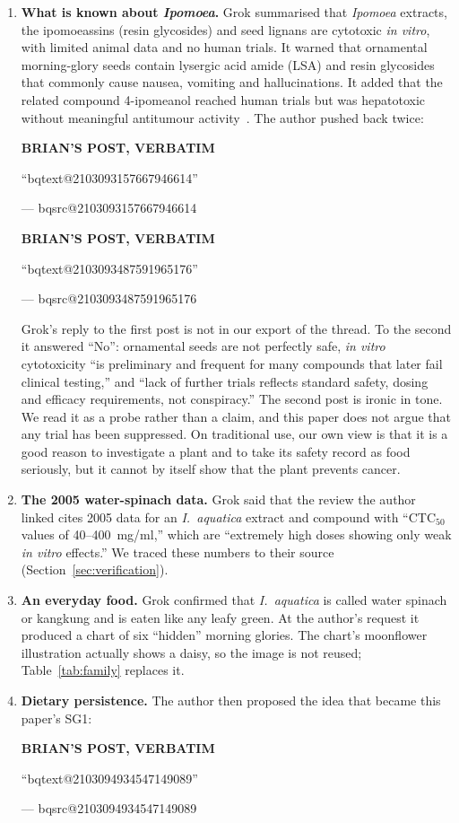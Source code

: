 \documentclass[11pt,a4paper]{article}
\makeatletter
\newcommand{\BQ}[1]{\begin{tcolorbox}[bqstyle]%
{\sffamily\bfseries\footnotesize\color{teal!80!black}BRIAN'S POST, VERBATIM}\par\smallskip
``\csname bqtext@#1\endcsname''\par\smallskip
{\raggedleft\footnotesize --- \csname bqsrc@#1\endcsname\par}\end{tcolorbox}}
\newcommand{\Ia}{\emph{I.~aquatica}}
\makeatother
\begin{document}
\begin{enumerate}[label=\textbf{\arabic*.}]
\item \textbf{What is known about \emph{Ipomoea}.} Grok summarised that \emph{Ipomoea} extracts, the ipomoeassins (resin glycosides) and seed lignans are cytotoxic \emph{in vitro}, with limited animal data and no human trials. It warned that ornamental morning-glory seeds contain lysergic acid amide (LSA) and resin glycosides that commonly cause nausea, vomiting and hallucinations. It added that the related compound 4-ipomeanol reached human trials but was hepatotoxic without meaningful antitumour activity~\cite{kasturi1998}. The author pushed back twice:

\BQ{2103093157667946614}
\BQ{2103093487591965176}

\noindent Grok's reply to the first post is not in our export of the thread. To the second it answered ``No'': ornamental seeds are not perfectly safe, \emph{in vitro} cytotoxicity ``is preliminary and frequent for many compounds that later fail clinical testing,'' and ``lack of further trials reflects standard safety, dosing and efficacy requirements, not conspiracy.'' The second post is ironic in tone. We read it as a probe rather than a claim, and this paper does not argue that any trial has been suppressed. On traditional use, our own view is that it is a good reason to investigate a plant and to take its safety record as food seriously, but it cannot by itself show that the plant prevents cancer.

\item \textbf{The 2005 water-spinach data.} Grok said that the review the author linked cites 2005 data for an \Ia{} extract and compound with ``CTC$_{50}$ values of 40--400~mg/ml,'' which are ``extremely high doses showing only weak \emph{in vitro} effects.'' We traced these numbers to their source (Section~\ref{sec:verification}).

\item \textbf{An everyday food.} Grok confirmed that \Ia{} is called water spinach or kangkung and is eaten like any leafy green. At the author's request it produced a chart of six ``hidden'' morning glories. The chart's moonflower illustration actually shows a daisy, so the image is not reused; Table~\ref{tab:family} replaces it.

\item \textbf{Dietary persistence.} The author then proposed the idea that became this paper's SG1:

\BQ{2103094934547149089}


\end{enumerate}
\end{document}
